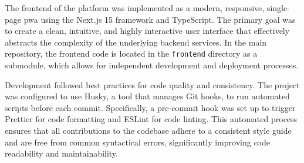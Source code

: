 The frontend of the platform was implemented as a modern, responsive, single-page \ac{pwa} using the Next.js 15 framework and TypeScript. The primary goal was to create a clean, intuitive, and highly interactive user interface that effectively abstracts the complexity of the underlying backend services. In the main repository, the frontend code is located in the \texttt{frontend} directory as a submodule, which allows for independent development and deployment processes.

Development followed best practices for code quality and consistency. The project was configured to use Husky, a tool that manages Git hooks, to run automated scripts before each commit. Specifically, a pre-commit hook was set up to trigger Prettier for code formatting and ESLint for code linting. This automated process ensures that all contributions to the codebase adhere to a consistent style guide and are free from common syntactical errors, significantly improving code readability and maintainability.